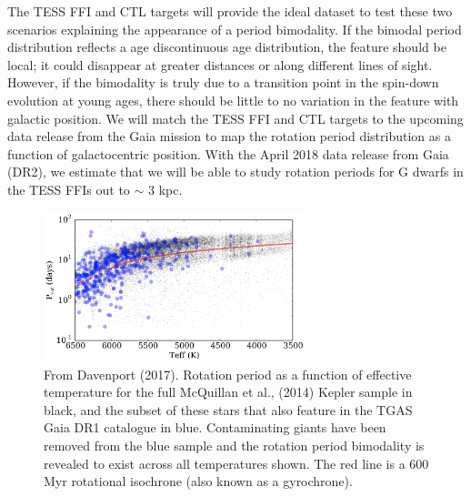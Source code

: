 \documentclass[useAMS, usenatbib, preprint, 12pt]{aastex}
\begin{document}
The TESS FFI and CTL targets will provide the ideal dataset to test these two
scenarios explaining the appearance of a period bimodality.
If the bimodal period distribution reflects a age discontinuous age
distribution, the feature should be local; it could
disappear at greater distances or along different lines of sight.
However, if the bimodality is truly due to a transition point in the spin-down
evolution at young ages, there should be little to no variation in the feature
with galactic position.
We will match the TESS FFI and CTL targets to the upcoming data
release from the Gaia mission \citep{perryman2001} to map the rotation period
distribution as a function of galactocentric position.
With the April 2018 data release from Gaia (DR2), we estimate that we will be
able to study rotation periods for G dwarfs in the TESS FFIs out to $\sim$ 3
kpc.


\begin{figure}
\begin{center}
\includegraphics[width=3in, clip=true]{Davenport.png}
\caption{From Davenport (2017).
    Rotation period as a function of effective
temperature for the full McQuillan et al., (2014) Kepler sample in black, and
the subset of these stars that also feature in the TGAS Gaia DR1 catalogue in
blue. Contaminating giants have been removed from the blue sample and the
rotation period bimodality is revealed to exist across all temperatures shown.
    The red line is a 600 Myr rotational isochrone (also known as a gyrochrone).}
\label{fig:davenport}
\end{center}
\end{figure}
\end{document}
